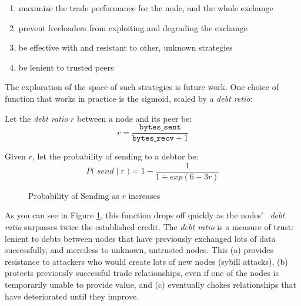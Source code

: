 \documentclass{sig-alternate}
\begin{document}
\begin{enumerate}
  \item maximize the trade performance for the node, and the whole exchange
  \item prevent freeloaders from exploiting and degrading the exchange
  \item be effective with and resistant to other, unknown strategies
  \item be lenient to trusted peers
\end{enumerate}

The exploration of the space of such strategies is future work.
One choice of function that works in practice is the sigmoid, scaled by a
\textit{debt retio}:

Let the \textit{debt ratio} $ r $ between a node and its peer be:
  \[ r = \dfrac{\texttt{bytes\_sent}}{\texttt{bytes\_recv} + 1} \]

Given $r$, let the probability of sending to a debtor be:
  \[ P\Big( \; send \; | \; r \;\Big) = 1 - \dfrac{1}{1 + exp(6-3r)} \]

\begin{figure}
\centering
{}
\caption{Probability of Sending as $r$ increases}
\label{fig:psending-graph}
\end{figure}

As you can see in Figure \ref{fig:psending-graph}, this function drops off quickly as the nodes' \
\textit{debt ratio} surpasses twice the established credit.
The \textit{debt ratio} is a measure of trust:
lenient to debts between nodes that have previously exchanged lots of data
successfully, and merciless to unknown, untrusted nodes. This
(a) provides resistance to attackers who would create lots of new nodes
(sybill attacks),
(b) protects previously successful trade relationships, even if one of the
nodes is temporarily unable to provide value, and
(c) eventually chokes relationships that have deteriorated until they
improve.
\end{document}
